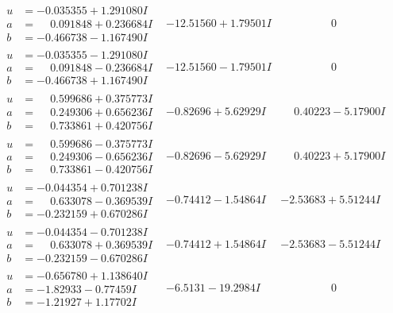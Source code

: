 \documentclass[1p]{elsarticle_modified}
\theoremstyle{definition}
\begin{document}
$$\begin{array}{c|c|c}
\begin{aligned}
u &= -0.035355 + 1.291080 I \\
a &= \phantom{-}0.091848 + 0.236684 I \\
b &= -0.466738 - 1.167490 I\end{aligned}
 & -12.51560 + 1.79501 I & \phantom{-0.000000 } 0 \\ \hline\begin{aligned}
u &= -0.035355 - 1.291080 I \\
a &= \phantom{-}0.091848 - 0.236684 I \\
b &= -0.466738 + 1.167490 I\end{aligned}
 & -12.51560 - 1.79501 I & \phantom{-0.000000 } 0 \\ \hline\begin{aligned}
u &= \phantom{-}0.599686 + 0.375773 I \\
a &= \phantom{-}0.249306 + 0.656236 I \\
b &= \phantom{-}0.733861 + 0.420756 I\end{aligned}
 & -0.82696 + 5.62929 I & \phantom{-}0.40223 - 5.17900 I \\ \hline\begin{aligned}
u &= \phantom{-}0.599686 - 0.375773 I \\
a &= \phantom{-}0.249306 - 0.656236 I \\
b &= \phantom{-}0.733861 - 0.420756 I\end{aligned}
 & -0.82696 - 5.62929 I & \phantom{-}0.40223 + 5.17900 I \\ \hline\begin{aligned}
u &= -0.044354 + 0.701238 I \\
a &= \phantom{-}0.633078 - 0.369539 I \\
b &= -0.232159 + 0.670286 I\end{aligned}
 & -0.74412 - 1.54864 I & -2.53683 + 5.51244 I \\ \hline\begin{aligned}
u &= -0.044354 - 0.701238 I \\
a &= \phantom{-}0.633078 + 0.369539 I \\
b &= -0.232159 - 0.670286 I\end{aligned}
 & -0.74412 + 1.54864 I & -2.53683 - 5.51244 I \\ \hline\begin{aligned}
u &= -0.656780 + 1.138640 I \\
a &= -1.82933 - 0.77459 I \\
b &= -1.21927 + 1.17702 I\end{aligned}
 & -6.5131 - 19.2984 I & \phantom{-0.000000 } 0 \\ \hline\begin{aligned}

\end{aligned}
\end{array}$$
\end{document}

